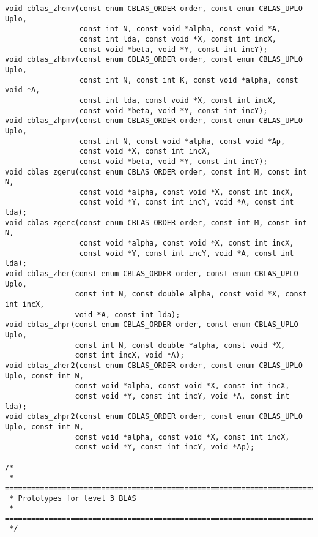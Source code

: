 \documentclass{article}
\begin{document}
\begin{Verbatim}[fontsize=\small,fontfamily=tt,fontshape=rm]
void cblas_zhemv(const enum CBLAS_ORDER order, const enum CBLAS_UPLO Uplo,
                 const int N, const void *alpha, const void *A,
                 const int lda, const void *X, const int incX,
                 const void *beta, void *Y, const int incY);
void cblas_zhbmv(const enum CBLAS_ORDER order, const enum CBLAS_UPLO Uplo,
                 const int N, const int K, const void *alpha, const void *A,
                 const int lda, const void *X, const int incX,
                 const void *beta, void *Y, const int incY);
void cblas_zhpmv(const enum CBLAS_ORDER order, const enum CBLAS_UPLO Uplo,
                 const int N, const void *alpha, const void *Ap,
                 const void *X, const int incX,
                 const void *beta, void *Y, const int incY);
void cblas_zgeru(const enum CBLAS_ORDER order, const int M, const int N,
                 const void *alpha, const void *X, const int incX,
                 const void *Y, const int incY, void *A, const int lda);
void cblas_zgerc(const enum CBLAS_ORDER order, const int M, const int N,
                 const void *alpha, const void *X, const int incX,
                 const void *Y, const int incY, void *A, const int lda);
void cblas_zher(const enum CBLAS_ORDER order, const enum CBLAS_UPLO Uplo,
                const int N, const double alpha, const void *X, const int incX,
                void *A, const int lda);
void cblas_zhpr(const enum CBLAS_ORDER order, const enum CBLAS_UPLO Uplo,
                const int N, const double *alpha, const void *X,
                const int incX, void *A);
void cblas_zher2(const enum CBLAS_ORDER order, const enum CBLAS_UPLO Uplo, const int N,
                const void *alpha, const void *X, const int incX,
                const void *Y, const int incY, void *A, const int lda);
void cblas_zhpr2(const enum CBLAS_ORDER order, const enum CBLAS_UPLO Uplo, const int N,
                const void *alpha, const void *X, const int incX,
                const void *Y, const int incY, void *Ap);

/*
 * ===========================================================================
 * Prototypes for level 3 BLAS
 * ===========================================================================
 */


\end{Verbatim}
\end{document}
